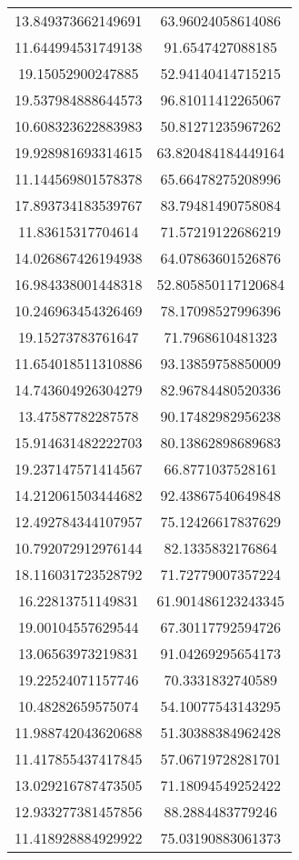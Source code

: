 \begin{table}
\begin{tabular}{cc}
13.849373662149691 & 63.96024058614086 \\
11.644994531749138 & 91.6547427088185 \\
19.15052900247885 & 52.94140414715215 \\
19.537984888644573 & 96.81011412265067 \\
10.608323622883983 & 50.81271235967262 \\
19.928981693314615 & 63.820484184449164 \\
11.144569801578378 & 65.66478275208996 \\
17.893734183539767 & 83.79481490758084 \\
11.83615317704614 & 71.57219122686219 \\
14.026867426194938 & 64.07863601526876 \\
16.984338001448318 & 52.805850117120684 \\
10.246963454326469 & 78.17098527996396 \\
19.15273783761647 & 71.7968610481323 \\
11.654018511310886 & 93.13859758850009 \\
14.743604926304279 & 82.96784480520336 \\
13.47587782287578 & 90.17482982956238 \\
15.914631482222703 & 80.13862898689683 \\
19.237147571414567 & 66.8771037528161 \\
14.212061503444682 & 92.43867540649848 \\
12.492784344107957 & 75.12426617837629 \\
10.792072912976144 & 82.1335832176864 \\
18.116031723528792 & 71.72779007357224 \\
16.22813751149831 & 61.901486123243345 \\
19.00104557629544 & 67.30117792594726 \\
13.06563973219831 & 91.04269295654173 \\
19.22524071157746 & 70.3331832740589 \\
10.48282659575074 & 54.10077543143295 \\
11.988742043620688 & 51.30388384962428 \\
11.417855437417845 & 57.06719728281701 \\
13.029216787473505 & 71.18094549252422 \\
12.933277381457856 & 88.2884483779246 \\
11.418928884929922 & 75.03190883061373 \\

\end{tabular}
\end{table}

